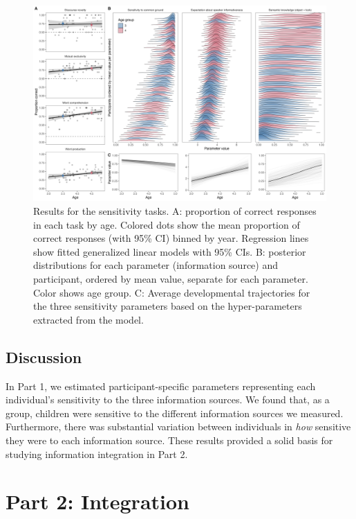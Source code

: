 \documentclass[
  man,floatsintext]{apa6}
\begin{document}
\begin{figure}
\includegraphics[width=1\linewidth]{./figures/fig2_3} \caption{Results for the sensitivity tasks. A: proportion of correct responses in each task by age. Colored dots show the mean proportion of correct responses (with 95\% CI) binned by year. Regression lines show fitted generalized linear models with 95\% CIs. B: posterior distributions for each parameter (information source) and participant, ordered by mean value, separate for each parameter. Color shows age group. C: Average developmental trajectories for the three sensitivity parameters based on the hyper-parameters extracted from the model.}\label{fig:fig2}
\end{figure}

\hypertarget{discussion}{%
\subsection{Discussion}\label{discussion}}

In Part 1, we estimated participant-specific parameters representing each individual's sensitivity to the three information sources. We found that, as a group, children were sensitive to the different information sources we measured. Furthermore, there was substantial variation between individuals in \emph{how} sensitive they were to each information source. These results provided a solid basis for studying information integration in Part 2.

\hypertarget{part-2-integration}{%
\section{Part 2: Integration}\label{part-2-integration}}
\end{document}
